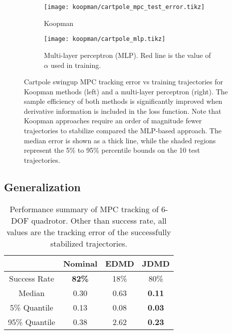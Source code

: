 \documentclass[../root.tex]{subfiles}
\newcommand{\changed}[1]{{\color{black} #1}}
\begin{document}
\begin{figure}[t]
  \centering
  \begin{subfigure}[t]{0.48\textwidth}
    \texttt{[image: koopman/cartpole\_mpc\_test\_error.tikz]}
    \caption{Koopman}
    \label{fig:cartpole_mpc_test_error}
  \end{subfigure}
  \hfill
  \begin{subfigure}[t]{0.48\textwidth}
    \texttt{[image: koopman/cartpole\_mlp.tikz]}
    \caption{Multi-layer perceptron (MLP). Red line is the value of $\alpha$ used in training.}
    \label{fig:cartpole_mlp}
  \end{subfigure}
  \caption{\changed{Cartpole swingup MPC tracking error vs training trajectories for Koopman methods (left) and 
  a multi-layer perceptron (right). The sample efficiency of both methods is significantly improved when 
  derivative information is included in the loss function. Note that Koopman approaches require an order of
  magnitude fewer trajectories to stabilize compared the MLP-based approach.
  The median error is shown as a thick line, while the shaded regions represent the 5\% to 95\% 
  percentile bounds on the 10 test trajectories. 
  }}
  \label{fig:sample_efficiency}
\end{figure}

\subsection{Generalization}

\begin{table}[t]
  \centering
	\begin{tabular}{cccc}\\
		\toprule  
		& {\color{black} \textbf{Nominal}} & {\color{orange} \textbf{EDMD}} & {\textbf{\color{cyan} JDMD}} \\
		\midrule
		Success Rate 		& \textbf{82\%} & 18\%	& 80\% \\
		Median      		& 0.30			& 0.63 	& \textbf{0.11} \\
            5\% Quantile        & 0.13          & 0.08 & \textbf{0.03} \\
            95\% Quantile       & 0.38          & 2.62  & \textbf{0.23} \\
		\bottomrule
	\end{tabular}
	\caption{Performance summary of MPC tracking of 6-DOF quadrotor. Other than success rate, all values are the tracking error of the successfully stabilized trajectories.}
	\label{tab:full_quad_tracking_mpc}
\end{table}
\end{document}
